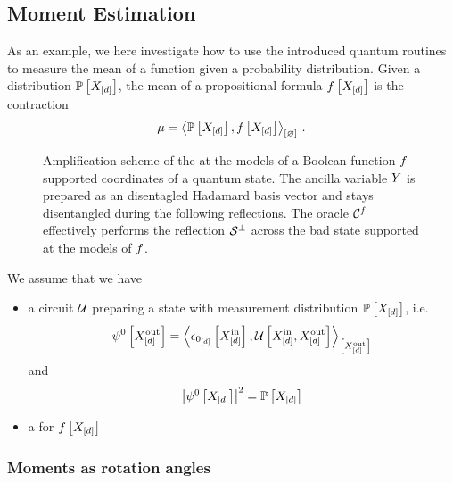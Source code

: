 \subsection{Moment Estimation}\label{sec:amplitudeEstimation}

As an example, we here investigate how to use the introduced quantum routines to measure the mean of a function given a probability distribution.
Given a distribution $\mathbb{P}\left[X_{[d]}\right]$, the mean of a propositional formula $f\left[X_{[d]}\right]$ is the contraction
\begin{align*}
    \mu
    = \left\langle \mathbb{P}\left[X_{[d]}\right],f\left[X_{[d]}\right]\right\rangle_{\left[ \varnothing \right]} \, .
\end{align*}

\begin{figure}
    \begin{center}
        
    \end{center}
    \caption{Amplification scheme of the at the models of a Boolean function $f$ supported coordinates of a quantum state.
    The ancilla variable $Y$ is prepared as an disentagled Hadamard basis vector and stays disentangled during the following reflections.
    The oracle $\mathcal{C}^{f}$ effectively performs the reflection $\mathcal{S}^{\perp}$ across the bad state supported at the models of $f$.}
    \label{fig:ancillaGrover}
\end{figure}


We assume that we have
\begin{itemize}
    \item a circuit $\mathcal{U}$ preparing a state with measurement distribution $\mathbb{P}\left[X_{[d]}\right]$, i.e.
    \begin{align*}
        \psi^{0}\left[X_{[d]}^{\mathrm{out}}\right]
        = \left\langle \epsilon_{0_{[d]}}\left[X_{[d]}^{\mathrm{in}}\right],
            \mathcal{U}\left[X_{[d]}^{\mathrm{in}},X_{[d]}^{\mathrm{out}}\right]
        \right\rangle_{\left[ X_{[d]}^{\mathrm{out}} \right]}
    \end{align*}
    and
    \begin{align*}
        \left|\psi^{0}\left[X_{[d]}\right]\right|^2
        = \mathbb{P}\left[X_{[d]}\right]
    \end{align*}
    \item a \computationCircuit{} for $f\left[X_{[d]}\right]$
\end{itemize}


\subsubsection{Moments as rotation angles}


